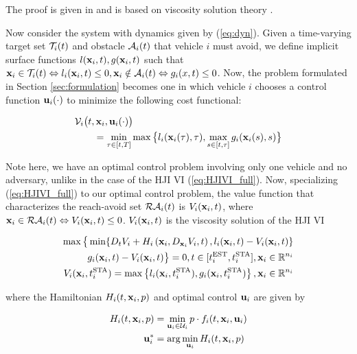 The proof is given in \cite{fisac15} and is based on viscosity solution theory \cite{evans84, barron90}.

Now consider the system with dynamics given by (\ref{eq:dyn}). Given a time-varying target set $\mathcal{T}_i(t)$ and obstacle $\mathcal{A}_i(t)$ that vehicle $i$ must avoid, we define implicit surface functions $l(\mathbf{x}_i,t), g(\mathbf{x}_i,t)$ such that $\mathbf{x}_i\in\mathcal{T}_i(t)\Leftrightarrow l_i(\mathbf{x}_i,t)\le 0,\mathbf{x}_i\notin \mathcal{A}_i(t) \Leftrightarrow g_i(x,t)\le 0$. Now, the problem formulated in Section \ref{sec:formulation} becomes one in which vehicle $i$ chooses a control function $\mathbf{u}_i(\cdot)$ to minimize the following cost functional:

\begin{equation}
\label{eq:cost}
\begin{aligned}
&\mathcal{V}_i\big(t,\mathbf{x}_i, \mathbf{u}_i(\cdot)\big) \\
&\qquad= \min_{\tau\in[t,T]}\max\big\{l_i(\mathbf{x}_i(\tau),\tau),\max_{s\in[t,\tau]} g_i(\mathbf{x}_i(s),s)\big\}
\end{aligned}
\end{equation}

Note here, we have an optimal control problem involving only one vehicle and no adversary, unlike in the case of the HJI VI (\ref{eq:HJIVI_full}). Now, specializing (\ref{eq:HJIVI_full}) to our optimal control problem, the value function that characterizes the reach-avoid set $\mathcal{RA}_i(t)$ is $V_i(\mathbf{x}_i, t)$, where $\mathbf{x}_i \in \mathcal{RA}_i(t) \Leftrightarrow V_i(\mathbf{x}_i, t) \le 0$. $V_i(\mathbf{x}_i, t)$ is the viscosity solution \cite{crandall84} of the HJI VI

\begin{equation}
\label{eq:HJI}
\begin{aligned}
\max\big\{\min\{D_t V_i + H_i\left(\mathbf{x}_i, D_{\mathbf{x}_i} V_i,t\right),l_i(\mathbf{x}_i,t)-V_i(\mathbf{x}_i, t)\}\\
\quad g_i(\mathbf{x}_i,t)-V_i(\mathbf{x}_i,t)\big\}=0, t\in[t^{\text{EST}}_i,t^{\text{STA}}_i], \mathbf{x}_i\in\mathbb{R}^{n_i}\\
V_i(\mathbf{x}_i,t^{\text{STA}}_i) = \max\left\{l_i(\mathbf{x}_i,t^{\text{STA}}_i),g_i(\mathbf{x}_i,t^{\text{STA}}_i)\right\}, \mathbf{x}_i\in\mathbb{R}^{n_i}
\end{aligned}
\end{equation}

\noindent where the Hamiltonian $H_i(t, \mathbf{x}_i, p)$ and optimal control $\mathbf{u}_i$ are given by

\begin{equation}
\begin{aligned}
H_i(t,\mathbf{x}_i,p) &= \min_{\mathbf{u}_i\in\mathcal{U}_i} p \cdot f_i(t,\mathbf{x}_i,\mathbf{u}_i) \\
\mathbf{u}^*_i &= \arg \min_{\mathbf{u}_i} H_i(t,\mathbf{x}_i,p)
\end{aligned}
\end{equation}


